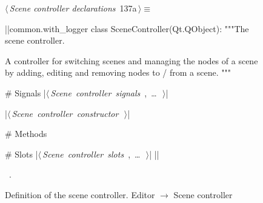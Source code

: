 \documentclass[%
    a4paper,    %
    justified,  %
    nobib,      %
    openany     %
]{tufte-book}
\makeatletter
\renewcommand{\label}[1]{\@tufte@label{##1}}%
\makeatother
\begin{document}
\begin{figure}[!htbp]
\begin{flushleft} \small
\begin{minipage}{\linewidth}\label{scrap86}\raggedright\small
{} $\langle\,${\itshape Scene controller declarations}\nobreak\ {\footnotesize {137a}}$\,\rangle\equiv$
\vspace{-1ex}
\begin{pythoncode}
|\normalfont{}\fontfamily{}|common.with_logger
class SceneController(Qt.QObject):
    """The scene controller.

    A controller for switching scenes and managing the nodes of
    a scene by adding, editing and removing nodes to / from a
    scene.
    """

    # Signals
    |\hbox{$\langle\,${\itshape Scene controller signals}\nobreak\ {\footnotesize {}, \ldots\ }$\,\rangle$}|

    |\hbox{$\langle\,${\itshape Scene controller constructor}\nobreak\ {\footnotesize {}}$\,\rangle$}|

    # Methods

    # Slots
    |\hbox{$\langle\,${\itshape Scene controller slots}\nobreak\ {\footnotesize {}, \ldots\ }$\,\rangle$}|
|\NWsep|
\end{pythoncode}
\vspace{1.5ex}
\footnotesize
\begin{list}{}{\setlength{\itemsep}{-\parsep}\setlength{\itemindent}{-\leftmargin}}
\item \NWtxtMacroRefIn\ .

\item{}
\end{list}
\end{minipage}\vspace{4ex}
\end{flushleft}
\caption{Definition of the scene controller.
  \newline{}\newline{}Editor $\rightarrow$ Scene controller}
\end{figure}
\end{document}
